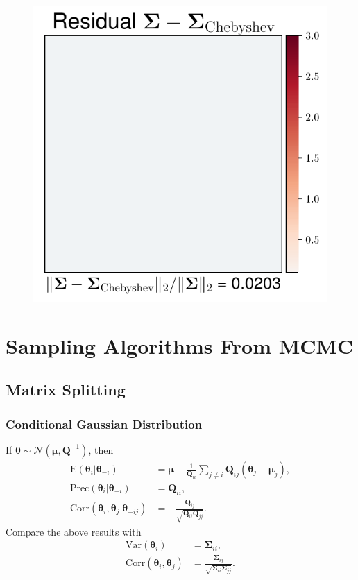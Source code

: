 \documentclass[aspectratio=169]{beamer}
\newcommand{\B}[1]{\mathbf{#1}} %
\newcommand{\Bs}[1]{\boldsymbol{#1}} %
\begin{document}
\begin{frame}
\begin{figure}
    \mbox{{\includegraphics[scale=0.3]{src/images/simu1_ex2_A_Cheby.pdf}}}
  \end{figure}
\end{frame}

\section{Sampling Algorithms From MCMC}
\subsection{Matrix Splitting}
\begin{frame}
\frametitle{Conditional Gaussian Distribution}
If $\Bs{\theta} \sim \mathcal{N}(\Bs{\mu},\B{Q}^{-1})$, then
\[
\begin{aligned}
\text{E}(\Bs{\theta}_i | \Bs{\theta}_{-i}) &= \Bs{\mu} - \frac{1}{\B{Q}_{ii} }\sum_{j\ne i} \B{Q}_{ij} (\Bs{\theta}_j - \Bs{\mu}_j), \\
\text{Prec}(\Bs{\theta}_i | \Bs{\theta}_{-i}) &= \B{Q}_{ii}, \\
\text{Corr}(\Bs{\theta}_i, \Bs{\theta}_j | \Bs{\theta}_{-ij}) &= -\frac{\B{Q}_{ij}}{\sqrt{\B{Q}_{ii}\B{Q}_{jj}}}.
\end{aligned}
\]
Compare the above results with
\[
\begin{aligned}
\text{Var}(\Bs{\theta}_i) &= \Bs{\Sigma}_{ii}, \\
\text{Corr}(\Bs{\theta}_i, \Bs{\theta}_j) &= \frac{\Bs{\Sigma}_{ij}}{\sqrt{\Bs{\Sigma}_{ii}\Bs{\Sigma}_{jj}}}.
\end{aligned}
\]
\end{frame}
\end{document}
